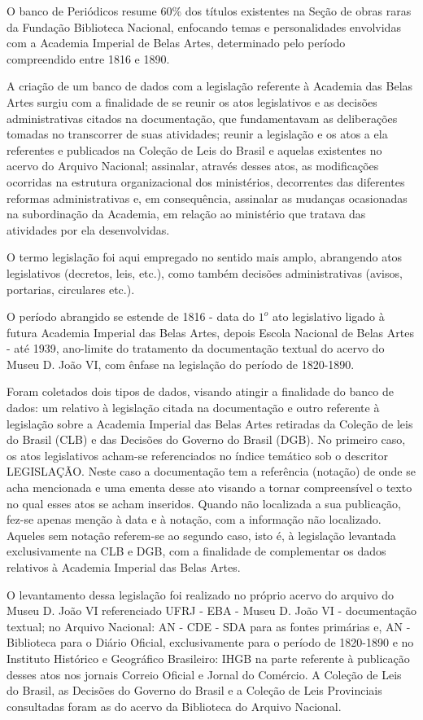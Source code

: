 O banco de Periódicos resume 60\% dos títulos existentes na Seção de obras raras da Fundação Biblioteca Nacional, enfocando temas e personalidades envolvidas com a Academia Imperial de Belas Artes, determinado pelo período compreendido entre 1816 e 1890.

A criação de um banco de dados com a legislação referente à Academia das Belas Artes surgiu com a finalidade de se reunir os atos legislativos e as decisões administrativas citados na documentação, que fundamentavam as deliberações tomadas no transcorrer de suas atividades; reunir a legislação e os atos a ela referentes e publicados na Coleção de Leis do Brasil e aquelas existentes no acervo do Arquivo Nacional; assinalar, através desses atos, as modificações ocorridas na estrutura organizacional dos ministérios, decorrentes das diferentes reformas administrativas e, em consequência, assinalar as mudanças ocasionadas na subordinação da Academia, em relação ao ministério que tratava das atividades por ela desenvolvidas.

O termo legislação foi aqui empregado no sentido mais amplo, abrangendo atos legislativos (decretos, leis, etc.), como também decisões administrativas (avisos, portarias, circulares etc.).

O período abrangido se estende de 1816 - data do $1^o$ ato legislativo ligado à futura Academia Imperial das Belas Artes, depois Escola Nacional de Belas Artes - até 1939, ano-limite do tratamento da documentação textual do acervo do Museu D. João VI, com ênfase na legislação do período de 1820-1890.

Foram coletados dois tipos de dados, visando atingir a finalidade do banco de dados: um relativo à legislação citada na documentação e outro referente à legislação sobre a Academia Imperial das Belas Artes retiradas da Coleção de leis do Brasil (CLB) e das Decisões do Governo do Brasil (DGB). No primeiro caso, os atos legislativos acham-se referenciados no índice temático sob o descritor LEGISLAÇÃO. Neste caso a documentação tem a referência (notação) de onde se acha mencionada e uma ementa desse ato visando a tornar compreensível o texto no qual esses atos se acham inseridos. Quando não localizada a sua publicação, fez-se apenas menção à data e à notação, com a informação não localizado. Aqueles sem notação referem-se ao segundo caso, isto é, à legislação levantada exclusivamente na CLB e DGB, com a finalidade de complementar os dados relativos à Academia Imperial das Belas Artes.

O levantamento dessa legislação foi realizado no próprio acervo do arquivo do Museu D. João VI referenciado UFRJ - EBA - Museu D. João VI - documentação textual; no Arquivo Nacional: AN - CDE - SDA para as fontes primárias e, AN - Biblioteca para o Diário Oficial, exclusivamente para o período de 1820-1890 e no Instituto Histórico e Geográfico Brasileiro: IHGB na parte referente à publicação desses atos nos jornais Correio Oficial e Jornal do Comércio. A Coleção de Leis do Brasil, as Decisões do Governo do Brasil e a Coleção de Leis Provinciais consultadas foram as do acervo da Biblioteca do Arquivo Nacional.

